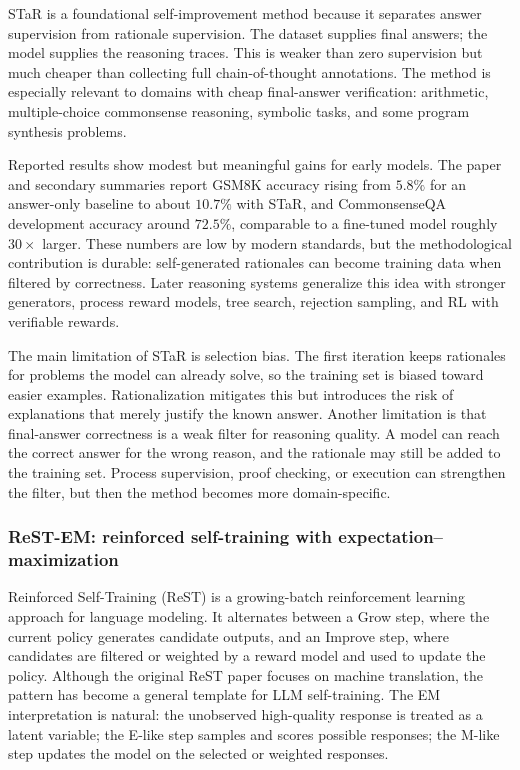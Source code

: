 STaR is a foundational self-improvement method because it separates answer supervision from rationale supervision. The dataset supplies final answers; the model supplies the reasoning traces. This is weaker than zero supervision but much cheaper than collecting full chain-of-thought annotations. The method is especially relevant to domains with cheap final-answer verification: arithmetic, multiple-choice commonsense reasoning, symbolic tasks, and some program synthesis problems.

Reported results show modest but meaningful gains for early models. The paper and secondary summaries report GSM8K \cite{gsm8k2021} accuracy rising from $5.8\%$ for an answer-only baseline to about $10.7\%$ with STaR, and CommonsenseQA development accuracy around $72.5\%$, comparable to a fine-tuned model roughly $30\times$ larger. These numbers are low by modern standards, but the methodological contribution is durable: self-generated rationales can become training data when filtered by correctness. Later reasoning systems generalize this idea with stronger generators, process reward models, tree search, rejection sampling, and RL with verifiable rewards.

The main limitation of STaR is selection bias. The first iteration keeps rationales for problems the model can already solve, so the training set is biased toward easier examples. Rationalization mitigates this but introduces the risk of explanations that merely justify the known answer. Another limitation is that final-answer correctness is a weak filter for reasoning quality. A model can reach the correct answer for the wrong reason, and the rationale may still be added to the training set. Process supervision, proof checking, or execution can strengthen the filter, but then the method becomes more domain-specific.

\subsubsection{ReST-EM: reinforced self-training with expectation--maximization}
\label{subsubsec:rest-em}

Reinforced Self-Training (ReST) is a growing-batch reinforcement learning approach for language modeling. It alternates between a Grow step, where the current policy generates candidate outputs, and an Improve step, where candidates are filtered or weighted by a reward model and used to update the policy. Although the original ReST paper focuses on machine translation, the pattern has become a general template for LLM self-training. The EM interpretation is natural: the unobserved high-quality response is treated as a latent variable; the E-like step samples and scores possible responses; the M-like step updates the model on the selected or weighted responses.

